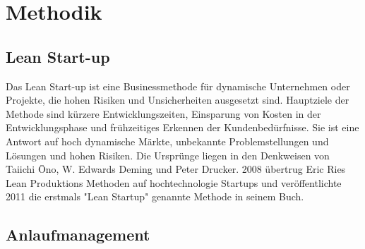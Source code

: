 \chapter{Methodik}

\section{Lean Start-up}

Das Lean Start-up ist eine Businessmethode für dynamische Unternehmen oder Projekte, die hohen Risiken und Unsicherheiten ausgesetzt sind. Hauptziele der Methode sind kürzere Entwicklungszeiten, Einsparung von Kosten in der Entwicklungsphase und frühzeitiges Erkennen der Kundenbedürfnisse. Sie ist eine Antwort auf hoch dynamische Märkte, unbekannte Problemstellungen und Lösungen und hohen Risiken. Die Ursprünge liegen in den Denkweisen von Taiichi Ōno, W. Edwards Deming und Peter Drucker. 2008 übertrug Eric Ries Lean Produktions Methoden auf hochtechnologie Startups und veröffentlichte 2011 die erstmals "Lean Startup" genannte Methode in seinem Buch. 



\section{Anlaufmanagement}


